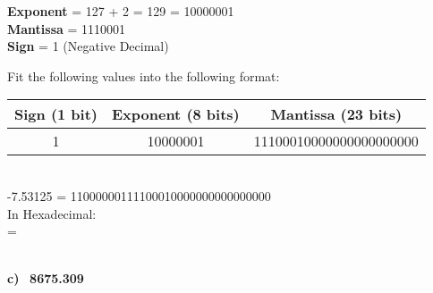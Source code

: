 \documentclass[12pt]{article}
\begin{document}
	\noindent \textbf{Exponent} = 127 + 2 = 129 = 10000001  \\
	\textbf{Mantissa} = 1110001  \\
	\textbf{Sign} = 1 (Negative Decimal)  \\
	
	\begin{center}
		Fit the following values into the following format: \vspace{0.25cm} \\
		
		\begin{tabular}{ |c|c|c| }
			\hline
			Sign (1 bit) & Exponent (8 bits) & Mantissa (23 bits) \\
			\hline
			1            & 10000001          & 11100010000000000000000 \\
			\hline
		\end{tabular} \vspace{1cm} \\
		
		
		-7.53125 = 11000000111100010000000000000000 \vspace{0.5cm} \\
		
		In Hexadecimal: \\
		=  \\
		  \vspace{2cm} \\
		
	\end{center} 
	
	
	
	
	
	
	
	
	
	
	
	
	
	\textbf{c)} \ \textbf{8675.309}
	
\end{document}
